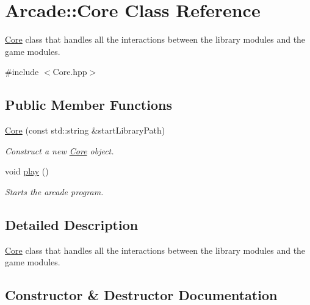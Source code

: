 \hypertarget{classArcade_1_1Core}{}\section{Arcade\+::Core Class Reference}
\label{classArcade_1_1Core}


\mbox{\hyperlink{classArcade_1_1Core}{Core}} class that handles all the interactions between the library modules and the game modules.  




{\ttfamily \#include $<$Core.\+hpp$>$}

\subsection*{Public Member Functions}
\begin{DoxyCompactItemize}
\item 
\mbox{\hyperlink{classArcade_1_1Core_a90e4ca21cf158c6052c5260dd1c2d3fe}{Core}} (const std\+::string \&start\+Library\+Path)
\begin{DoxyCompactList}\small\item\em Construct a new \mbox{\hyperlink{classArcade_1_1Core}{Core}} object. \end{DoxyCompactList}\item 
\mbox{\label{classArcade_1_1Core_a1fa1bbdf2f04998f4c2a2d085821b9dd}} 
void \mbox{\hyperlink{classArcade_1_1Core_a1fa1bbdf2f04998f4c2a2d085821b9dd}{play}} ()
\begin{DoxyCompactList}\small\item\em Starts the arcade program. \end{DoxyCompactList}\end{DoxyCompactItemize}


\subsection{Detailed Description}
\mbox{\hyperlink{classArcade_1_1Core}{Core}} class that handles all the interactions between the library modules and the game modules. 

\subsection{Constructor \& Destructor Documentation}
\mbox{\label{classArcade_1_1Core_a90e4ca21cf158c6052c5260dd1c2d3fe}} 
